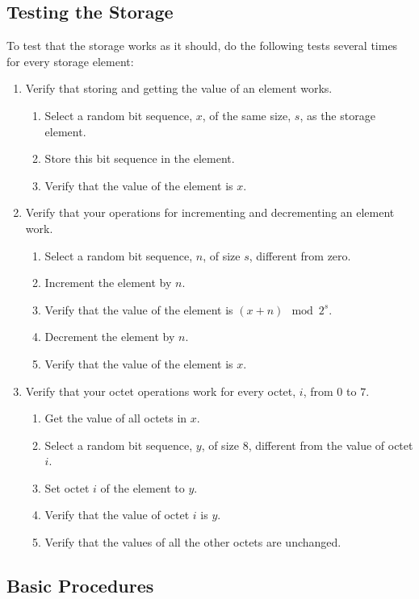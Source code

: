 \documentclass[a4paper,12pt]{article}
\begin{document}
\subsection{Testing the Storage}

To test that the storage works as it should, do the following tests several times for every storage element:
\begin{enumerate}
\item Verify that storing and getting the value of an element works.
  \begin{enumerate}
  \item Select a random bit sequence, $x$, of the same size, $s$, as the storage element.
  \item Store this bit sequence in the element.
  \item Verify that the value of the element is $x$.
  \end{enumerate}
\item Verify that your operations for incrementing and decrementing an element work.
  \begin{enumerate}
  \item Select a random bit sequence, $n$, of size $s$, different from zero.
  \item Increment the element by $n$.
  \item Verify that the value of the element is $(x + n) \mod 2^s$.
  \item Decrement the element by $n$.
  \item Verify that the value of the element is $x$.
  \end{enumerate}
\item Verify that your octet operations work for every octet, $i$, from $0$ to $7$.
  \begin{enumerate}
  \item Get the value of all octets in $x$.
  \item Select a random bit sequence, $y$, of size $8$, different from the value of octet $i$.
  \item Set octet $i$ of the element to $y$.
  \item Verify that the value of octet $i$ is $y$.
  \item Verify that the values of all the other octets are unchanged.
  \end{enumerate}
\end{enumerate}

\subsection{Basic Procedures}
\end{document}
